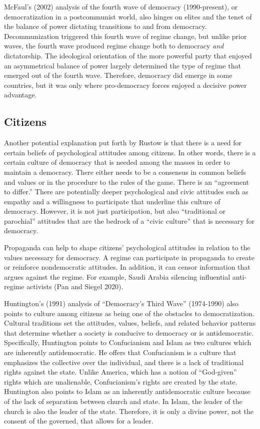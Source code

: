 \documentclass[12pt,]{article}
\begin{document}
McFaul's (2002) analysis of the fourth wave of democracy (1990-present),
or democratization in a postcommunist world, also hinges on elites and
the tenet of the balance of power dictating transitions to and from
democracy. Decommunization triggered this fourth wave of regime change,
but unlike prior waves, the fourth wave produced regime change both to
democracy \emph{and} dictatorship. The ideological orientation of the
more powerful party that enjoyed an asymmetrical balance of power
largely determined the type of regime that emerged out of the fourth
wave. Therefore, democracy did emerge in some countries, but it was only
where pro-democracy forces enjoyed a decisive power advantage.

\hypertarget{citizens}{%
\subsection{Citizens}\label{citizens}}

Another potential explanation put forth by Rustow is that there is a
need for certain beliefs of psychological attitudes among citizens. In
other words, there is a certain culture of democracy that is needed
among the masses in order to maintain a democracy. There either needs to
be a consensus in common beliefs and values or in the procedure to the
rules of the game. There is an ``agreement to differ.'' There are
potentially deeper psychological and civic attitudes such as empathy and
a willingness to participate that underline this culture of democracy.
However, it is not just participation, but also ``traditional or
parochial'' attitudes that are the bedrock of a ``civic culture'' that
is necessary for democracy.

Propaganda can help to shape citizens' psychological attitudes in
relation to the values necessary for democracy. A regime can participate
in propaganda to create or reinforce nondemocratic attitudes. In
addition, it can censor information that argues against the regime. For
example, Saudi Arabia silencing influential anti-regime activists (Pan
and Siegel 2020).

Huntington's (1991) analysis of ``Democracy's Third Wave'' (1974-1990)
also points to culture among citizens as being one of the obstacles to
democratization. Cultural traditions set the attitudes, values, beliefs,
and related behavior patterns that determine whether a society is
conducive to democracy or is antidemocratic. Specifically, Huntington
points to Confucianism and Islam as two cultures which are inherently
antidemocratic. He offers that Confucianism is a culture that emphasizes
the collective over the individual, and there is a lack of traditional
rights against the state. Unlike America, which has a notion of
``God-given'' rights which are unalienable, Confucianism's rights are
created by the state. Huntington also points to Islam as an inherently
antidemocratic culture because of the lack of separation between church
and state. In Islam, the leader of the church is also the leader of the
state. Therefore, it is only a divine power, not the consent of the
governed, that allows for a leader.
\end{document}
